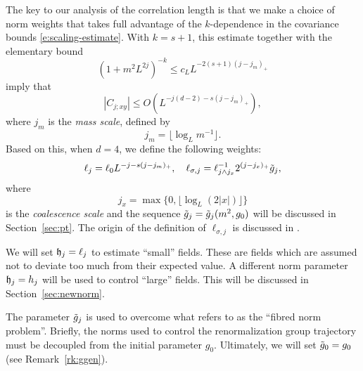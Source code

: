 The key to our analysis of the correlation length is that we make a choice of norm
weights that takes full advantage of the
$k$-dependence in the covariance bounds \eqref{e:scaling-estimate}.
With $k = s + 1$, this estimate together with the elementary bound
\begin{equation}
\label{e:mass-decay}
(1 + m^2 L^{2j})^{-k} \le c_L L^{-2(s+1)(j - j_m)_+}
\end{equation}
imply that
\begin{equation}
|C_{j;xy}| \le O(L^{-j (d - 2) - s (j - j_m)_+}),
\end{equation}
where $j_m$ is the \emph{mass scale}, defined by
\begin{equation}
\label{e:jmdef}
j_m	= \lfloor\log_{L} m^{-1}\rfloor.
\end{equation}
Based on this, when $d = 4$, we define the following weights:
\begin{equation}
\label{e:elldef-zz}
\ell_j
	=
\ell_0 L^{-j - s (j - j_m)_+},
	\quad
\ell_{\sigma,j}
	=
\ell_{j \wedge j_{x}}^{-1} 2^{(j - j_{x})_+} \tilde{g}_j,
\end{equation}
where
\begin{equation}
\label{e:jxdef}
j_x = \max\{0,\lfloor \log_{L} (2 |x|)\rfloor\}
\end{equation}
is the \emph{coalescence scale} and the sequence $\tilde{g}_j = \tilde{g}_j(m^2,g_0)$ will
be discussed in Section~\ref{sec:pt}.
The origin of the definition of $\ell_{\sigma,j}$ is discussed in
\cite[Remark~\ref{IE-rk:hsigmot}]{BS-rg-IE}.

We will set $\mathfrak{h}_j = \ell_j$ to estimate ``small'' fields. These are fields which
are assumed not to deviate too much from their expected value. A different norm
parameter $\mathfrak{h}_j = h_j$ will be used to control ``large'' fields.
This will be discussed in Section~\ref{sec:newnorm}.

\begin{rk}
The parameter $\tilde{g}_j$ is used to overcome what \cite{Abde07} refers to as the
``fibred norm problem''. Briefly, the norms used to control the renormalization
group trajectory must be decoupled from the initial parameter $g_0$. Ultimately,
we will set $\tilde{g}_0 = g_0$ (see Remark~\ref{rk:ggen}).
\end{rk}


